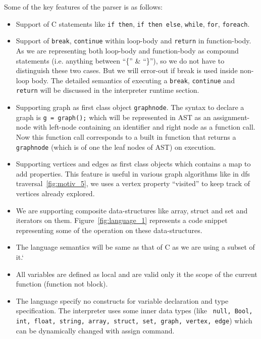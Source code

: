     Some of the key features of the parser is as follows:
    \begin{itemize}
      \item Support of C statements like  {\tt if then}, {\tt if then 
        else}, {\tt while}, {\tt for}, {\tt foreach}. 

      \item Support of {\tt break}, {\tt continue} within loop-body 
      and {\tt return} in function-body.
      As we are representing both loop-body and function-body as compound 
      statements (i.e. anything between ``\{'' \& ``\}''), so we do not have to
      distinguish these two cases. But we will error-out if break is used inside 
      non-loop body. The detailed semantics of executing a {\tt break},   
{\tt continue} and {\tt return} will be discussed in the interpreter 
runtime section.

      \item Supporting graph as first class object {\tt graphnode}.
      The syntax to declare a graph is {\tt g = graph();} which will be 
      represented in AST as an assignment-node with left-node containing an 
      identifier and right
      node as a function call. Now this function call corresponds to a built in 
      function that returns a {\tt graphnode} (which is of one the leaf 
          nodes of AST) on execution.

      \item Supporting vertices and edges as first class objects which contains 
      a map to add properties. This feature is useful in various graph 
      algorithms like in dfs traversal~\ref{fig:motiv_5}, we uses a vertex property ``visited'' 
      to keep track of vertices already explored.

      \item We are supporting composite data-structures like array, struct and 
      set and iterators on them. Figure~\ref{fig:language_1} represents a code 
      snippet representing some of the operation on these data-structures.

      \item The language semantics will be same as that of C as we are using a subset of it.`

      \item All variables are defined as local and are valid only it the scope of the current function (function not block).

      \item The language specify no constructs for variable declaration and type 
      specification. The interpreter uses some inner data types (like {\tt 
          null, Bool, int, float, string, array, struct, set, graph, vertex, 
          edge})  which can be dynamically changed with assign command.

    \end{itemize}
    
  
